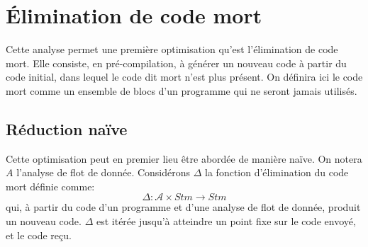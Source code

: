 \documentclass[a4paper, 12pt]{article}
\begin{document}
\section{Élimination de code mort}
Cette analyse permet une première optimisation qu'est l'élimination de code mort. Elle consiste, en pré-compilation,
à générer un nouveau code à partir du code initial, dans lequel le code dit mort n'est plus présent.
On définira ici le code mort comme un ensemble de blocs d'un programme qui ne seront jamais utilisés.

\subsection{Réduction naïve}
Cette optimisation peut en premier lieu être abordée de manière naïve. On notera $A$ l'analyse de flot de donnée.
Considérons $\Delta$ la fonction d'élimination du code mort définie comme:
\[\Delta : \mathcal{A} \times Stm \longrightarrow Stm\]
qui, à partir du code d'un programme et d'une analyse de flot de donnée, produit un nouveau code. $\Delta$ est itérée
jusqu'à atteindre un point fixe sur le code envoyé, et le code reçu.
\end{document}
